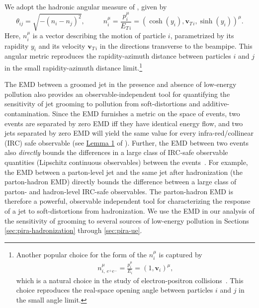 We adopt the hadronic angular measure of , given by
\begin{equation}
    \theta_{ij} = \sqrt{-(n_i - n_j)^2}
    ,
    ~~~~~~
    ~~~~~~
    n_{i}^\mu = \frac{p_i^\mu}{E_{T\,i}} = (\cosh(y_i), \textbf{v}_{T\,i}, \sinh(y_i))^\mu
    .
    \label{eq:hadronic_metric}
\end{equation}
Here, \(n_i^\mu\) is a vector describing the motion of particle \(i\), parametrized by its rapidity \(y_i\) and its velocity \(\textbf{v}_{T\, i}\) in the directions transverse to the beampipe.
%
This angular metric reproduces the rapidity-azimuth distance between particles \(i\) and \(j\) in the small rapidity-azimuth distance limit.\footnote{
Another popular choice for the form of the \(n_i^\mu\) is captured by
\begin{align}
    \label{eq:ee_metric}
    n_{i,~{e^+e^-}}^\mu = \frac{p_i^\mu}{E_i} = (1, \textbf{v}_i)^\mu
    ,
\end{align}
which is a natural choice in the study of electron-positron collisions~\cite{Komiske:2020qhg}.
%
This choice reproduces the real-space opening angle between particles \(i\) and \(j\) in the small angle limit.
}

The EMD between a groomed jet in the presence and absence of low-energy pollution also provides an observable-independent tool for quantifying the sensitivity of jet grooming to pollution from \glspl{soft-distortion} and \gls{additive-contamination}.
%
Since the EMD furnishes a metric on the space of events, two events are separated by zero EMD iff they have identical energy flow, and two jets separated by zero EMD will yield the same value for every infra-red/collinear (IRC) safe observable (see \href{https://arxiv.org/pdf/2004.04159.pdf#page=11\&zoom=100,0,650}{Lemma 1} of ).
%
Further, the EMD between two events also \textit{directly} bounds the differences in a large class of IRC-safe observable quantities (Lipschitz continuous observables) between the events~\cite{Komiske:2019fks}.
%
For example, the EMD between a parton-level jet and the same jet after \gls{hadronization} (the parton-hadron EMD) directly bounds the difference between a large class of parton- and hadron-level IRC-safe observables.
%
The parton-hadron EMD is therefore a powerful, observable independent tool for characterizing the response of a jet to \glspl{soft-distortion} from \gls{hadronization}.
%
We use the EMD in our analysis of the sensitivity of grooming to several sources of low-energy pollution in Sections \ref{sec:pira-hadronization} through \ref{sec:pira-ue}.


